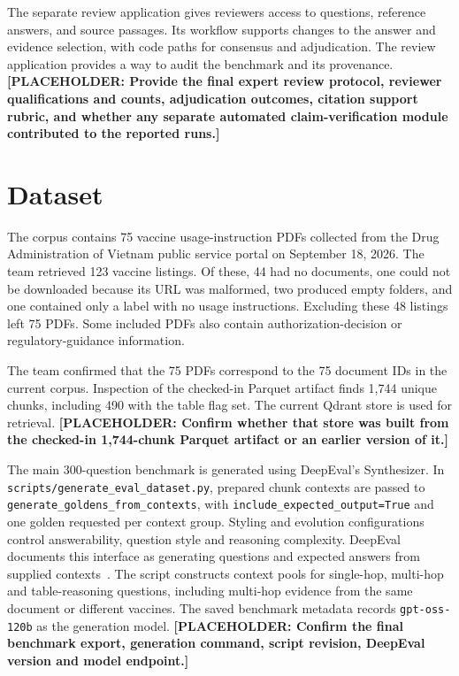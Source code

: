 \documentclass[oneside]{sn-jnl}
\newcommand{\pending}[1]{\textbf{\textcolor{red!65!black}{[PLACEHOLDER: #1]}}}
\newcommand{\artifact}[1]{\nolinkurl{#1}}
\begin{document}
The separate review application gives reviewers access to questions, reference answers, and source passages. Its workflow supports changes to the answer and evidence selection, with code paths for consensus and adjudication. The review application provides a way to audit the benchmark and its provenance.
\pending{Provide the final expert review protocol, reviewer qualifications and counts, adjudication outcomes, citation support rubric, and whether any separate automated claim-verification module contributed to the reported runs.}

\section{Dataset}
The corpus contains 75 vaccine usage-instruction PDFs collected from the Drug Administration of Vietnam public service portal on September 18, 2026. The team retrieved 123 vaccine listings. Of these, 44 had no documents, one could not be downloaded because its URL was malformed, two produced empty folders, and one contained only a label with no usage instructions. Excluding these 48 listings left 75 PDFs. Some included PDFs also contain authorization-decision or regulatory-guidance information.

The team confirmed that the 75 PDFs correspond to the 75 document IDs in the current corpus. Inspection of the checked-in Parquet artifact finds 1,744 unique chunks, including 490 with the table flag set. The current Qdrant store is used for retrieval. \pending{Confirm whether that store was built from the checked-in 1,744-chunk Parquet artifact or an earlier version of it.}

The main 300-question benchmark is generated using DeepEval's Synthesizer. In \artifact{scripts/generate_eval_dataset.py}, prepared chunk contexts are passed to \artifact{generate_goldens_from_contexts}, with \artifact{include_expected_output=True} and one golden requested per context group. Styling and evolution configurations control answerability, question style and reasoning complexity. DeepEval documents this interface as generating questions and expected answers from supplied contexts~\cite{deepevalcontexts}. The script constructs context pools for single-hop, multi-hop and table-reasoning questions, including multi-hop evidence from the same document or different vaccines. The saved benchmark metadata records \artifact{gpt-oss-120b} as the generation model. \pending{Confirm the final benchmark export, generation command, script revision, DeepEval version and model endpoint.}
\end{document}

